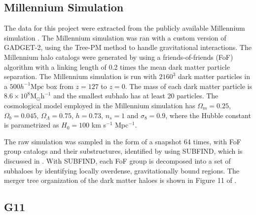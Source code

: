 \documentclass[a4paper,fleqn,usenatbib]{mnras}
\begin{document}
\subsection{Millennium Simulation} \label{mgf:db_mill}
\par The data for this project were extracted from the publicly available Millennium simulation \citep{springel2005cosmological, springel2005simulations}. The Millennium simulation was ran with a custom version of GADGET-2, using the Tree-PM method \citep{xu1994new} to handle gravitational interactions. The Millennium halo catalogs were generated by using a friends-of-friends (FoF) algorithm with a linking length of 0.2 times the mean dark matter particle separation. The Millennium simulation is run with $2160^3$ dark matter particles in a $500 h^{-1} \textrm{Mpc}$ box from $z=127$ to $z=0$. The mass of each dark matter particle is $8.6 \times 10^8 \textrm{M}_{\odot}\textrm{h}^{-1}$ and the smallest subhalo has at least 20 particles. The cosmological model employed in the Millennium simulation has $\Omega_m = 0.25$, $\Omega_b = 0.045$, $\Omega_{\Lambda} = 0.75$, $h = 0.73$, $n_s = 1$ and $\sigma_8 = 0.9$, where the Hubble constant is parametrized as $H_0 = 100 $ km s$^{-1}$ Mpc$^{-1}$. 

\par The raw simulation was sampled in the form of a snapshot 64 times, with FoF group catalogs and their substructures, identified by using SUBFIND, which is discussed in \citet{springel2001populating}. With SUBFIND, each FoF group is decomposed into a set of subhaloes by identifying locally overdense, gravitationally bound regions. The merger tree organization of the dark matter haloes is shown in Figure 11 of \citet{springel2005simulations}. 

\subsection{G11} \label{mdf:db_sam}
\end{document}
